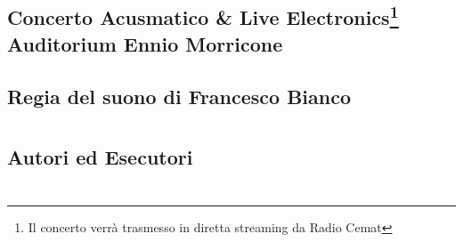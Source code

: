 \documentclass[8pt, twoside, a5paper]{extreport}
\begin{document}
\subsection*{{\small Concerto Acusmatico \& Live Electronics\footnote{ Il concerto verrà trasmesso in diretta streaming da Radio Cemat}} \\
	\textsf{Auditorium Ennio Morricone}}

{\fontsize{30}{30} }

\subsection*{\textsf{Regia del suono di Francesco Bianco}}

\bigskip

\begin{multicols}{2}




\end{multicols}

\clearpage





\section*{ }

\subsection*{\textsf{Autori ed Esecutori}\\}

{\fontsize{30}{30} }


\begin{multicols}{2}



\end{multicols}

\clearpage

\section*{ }

\end{document}
